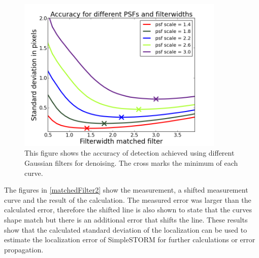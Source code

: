 \begin{figure}
\centering
\includegraphics[width = 0.88\textwidth]{pictures/matchedFilterPlots1.png}
	 \caption{This figure shows the accuracy of detection achieved using different Gaussian filters for denoising. The cross marks the minimum of each curve.}
	\label{matchedFilter1}
\end{figure}

The figures in \ref{matchedFilter2} show the measurement, a shifted measurement curve and the result of the calculation. The measured error was larger than the calculated error, therefore the shifted line is also shown to state that the curves shape match but there is an additional error that shifts the line. \newline
These results show that the calculated standard deviation of the localization can be used to estimate the localization error of SimpleSTORM for further calculations or error propagation.

